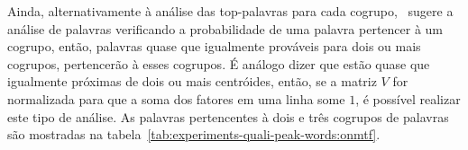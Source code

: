 \documentclass[
    12pt,                %
    oneside,            %
    a4paper,            %
    english,            %
    brazil                %
    ]{abntex2ppgsi}
\begin{document}
Ainda, alternativamente à análise das top-palavras para cada cogrupo,~ sugere a análise de palavras verificando a probabilidade de uma palavra pertencer à um cogrupo, então, palavras quase que igualmente prováveis para dois ou mais cogrupos, pertencerão à esses cogrupos.
É análogo dizer que estão quase que igualmente próximas de dois ou mais centróides, então, se a matriz $V$ for normalizada para que a soma dos fatores em uma linha some $1$, é possível realizar este tipo de análise.
As palavras pertencentes à dois e três cogrupos de palavras são mostradas na tabela~\ref{tab:experiments-quali-peak-words:onmtf}.

\begin{table}[H]
\centering
    \caption{Análise de palavras pertencentes à dois e três cogrupos, com os fatores da matriz $V$ normalizados}
\end{table}
\end{document}
